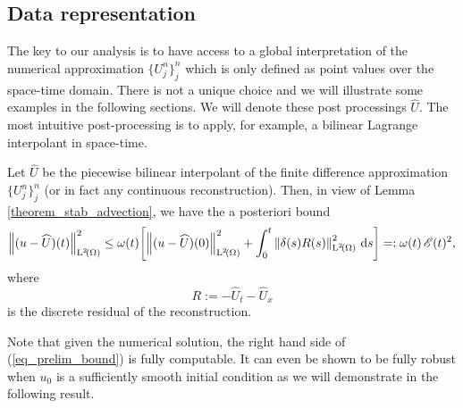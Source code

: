 \documentclass[final]{amsart}
\renewcommand{\d}{\ensuremath{\,\mathrm{d}}}
\numberwithin{equation}{section}
\begin{document}

\subsection{Data representation}

The key to our analysis is to have access to a global interpretation
of the numerical approximation $\{ U^n_j \}_{j}^{n}$ which is only
defined as point values over the space-time domain. There is not a
unique choice and we will illustrate some examples in the following
sections. We will denote these post processings $\widehat U$. The most
intuitive post-processing is to apply, for example, a bilinear
Lagrange interpolant in space-time.

\begin{Cor}
	\label{cor:aposteriori}
	Let $\widehat U$ be the piecewise bilinear interpolant of the
        finite difference approximation $\{ U^n_j \}_{j}^n$ (or in
        fact any continuous reconstruction). Then, in view of Lemma
        \ref{theorem_stab_advection}, we have the a posteriori bound
	\begin{equation}\label{eq_prelim_bound}
	\Norm{(u - \widehat{U})\qp{t}}^2_{\leb{2}\qp{\W}}
	\leq
	\w(t)
	\qb{\Norm{(u - \widehat{U})\qp{0}}^2_{\leb{2}\qp{\W}}+\int_0^t\Norm{\delta(s) R(s)}^2_{\leb{2}\qp{\W}}  \d s }
	=: \w\qp{t}\cE(t)^2
	,
	\end{equation}
	where
	\begin{equation}\label{eq:residual_advection}
	R := - \widehat U_t - \widehat U_x
	\end{equation}
	is the discrete residual of the reconstruction.
\end{Cor}

Note that given the numerical solution, the right hand side of
(\ref{eq_prelim_bound}) is fully computable. It can even be shown to
be fully robust when $u_0$ is a sufficiently smooth initial condition
as we will demonstrate in the following result.
\end{document}
